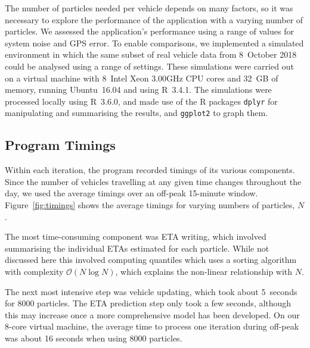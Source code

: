 The number of particles needed per vehicle
depends on many factors,
so it was necessary to explore the performance of the application
with a varying number of particles.
We assessed the application's performance
using a range of values for
system noise and GPS error.
To enable comparisons, we implemented a simulated \rt environment
in which the same subset of real vehicle data from 8~October 2018
could be analysed using a range of settings.
These simulations were carried out on a virtual machine
with 8~Intel Xeon 3.00GHz CPU cores and 32~GB of memory,
running \textsf{Ubuntu}~16.04 and using \textsf{R}~3.4.1.
The simulations were processed locally using \textsf{R}~3.6.0,
and made use of the \textsf{R} packages \verb+dplyr+ \citep{dplyr}
for manipulating and summarising the results,
and \verb+ggplot2+ \citep{ggplot2} to graph them.


\subsection{Program Timings}
\label{sec:timings}

Within each iteration, the program recorded timings of its various components.
Since the number of vehicles travelling at any given time changes throughout the day,
we used the average timings over an off-peak 15-minute window.
Figure~\ref{fig:timings} shows the average timings for
varying numbers of particles, $N$.


The most time-consuming component was ETA writing,
which involved summarising the individual ETAs estimated for each particle.
While not discussed here this involved computing quantiles which uses a sorting algorithm
with complexity $\mathcal{O}(N \log N)$,
which explains the non-linear relationship with $N$.


The next most intensive step was vehicle updating,
which took about 5~seconds for 8000 particles.
The ETA prediction step only took a few seconds,
although this may increase once a more comprehensive model has been developed.
On our 8-core virtual machine,
the average time to process one iteration during off-peak
was about 16 seconds when using 8000 particles.

